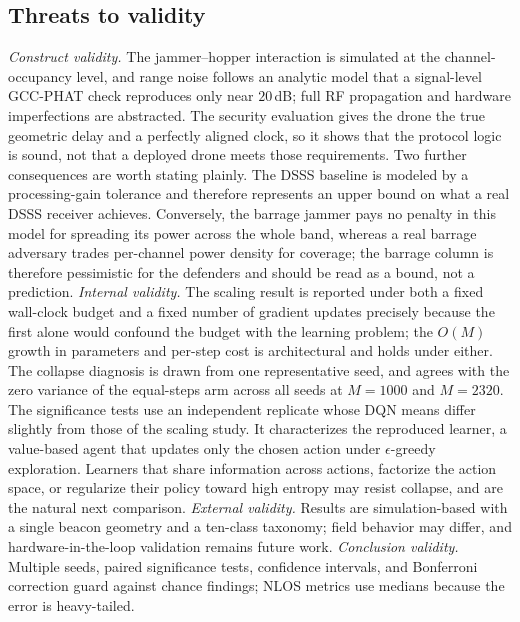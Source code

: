\documentclass[journal]{IEEEtran}
\begin{document}
\subsection{Threats to validity}
\emph{Construct validity.} The jammer--hopper interaction is simulated at the
channel-occupancy level, and range noise follows an analytic model that a
signal-level GCC-PHAT check reproduces only near $20$\,dB; full RF propagation
and hardware imperfections are abstracted. The security evaluation gives the
drone the true geometric delay and a perfectly aligned clock, so it shows that
the protocol logic is sound, not that a deployed drone meets those
requirements. Two further consequences are worth stating plainly. The DSSS baseline is modeled by a
processing-gain tolerance and therefore represents an upper bound on what a real
DSSS receiver achieves. Conversely, the barrage jammer pays no penalty in this
model for spreading its power across the whole band, whereas a real barrage
adversary trades per-channel power density for coverage; the barrage column is
therefore pessimistic for the defenders and should be read as a bound, not a
prediction.
\emph{Internal validity.} The scaling result is reported under both a fixed
wall-clock budget and a fixed number of gradient updates precisely because the
first alone would confound the budget with the learning problem; the $O(M)$
growth in parameters and per-step cost is architectural and holds under either.
The collapse diagnosis is drawn from one representative seed, and agrees with
the zero variance of the equal-steps arm across all seeds at $M{=}1000$ and
$M{=}2320$. The significance tests use an independent replicate whose DQN means
differ slightly from those of the scaling study. It characterizes the reproduced learner, a value-based agent that
updates only the chosen action under $\epsilon$-greedy exploration. Learners
that share information across actions, factorize the action space, or
regularize their policy toward high entropy may resist collapse, and are the
natural next comparison.
\emph{External validity.} Results are simulation-based with a single beacon
geometry and a ten-class taxonomy; field behavior may differ, and
hardware-in-the-loop validation remains future work.
\emph{Conclusion validity.} Multiple seeds, paired significance tests,
confidence intervals, and Bonferroni correction guard against chance findings;
NLOS metrics use medians because the error is heavy-tailed.

\end{document}
